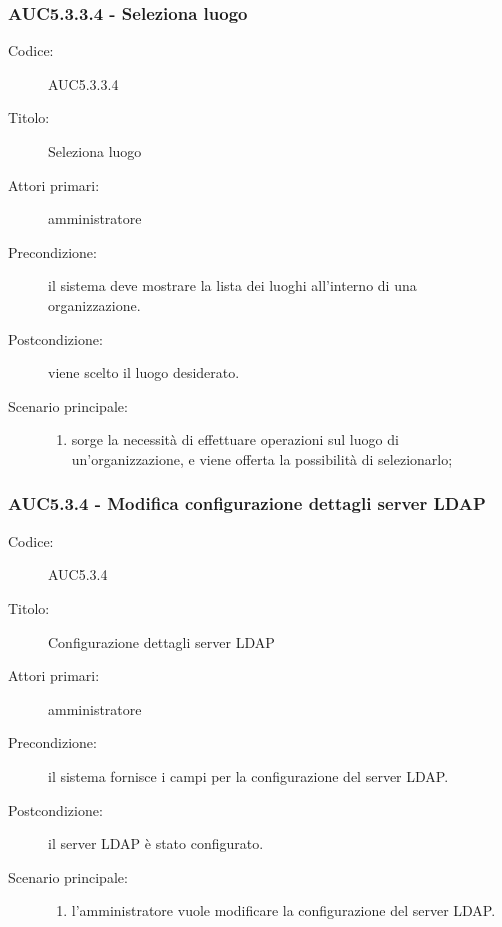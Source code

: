\documentclass[../analisi-dei-requisiti.tex]{subfiles}
\begin{document}
\subsubsection{AUC5.3.3.4 - Seleziona luogo}%
\label{subsub:AUC5.3.3.4}
\begin{description}
  \item[Codice:] AUC5.3.3.4
  \item[Titolo:] Seleziona luogo
  \item[Attori primari:] amministratore
  \item[Precondizione:] il sistema deve mostrare la lista dei luoghi all'interno di una organizzazione.
  \item[Postcondizione:] viene scelto il luogo desiderato.
  \item[Scenario principale:]
  \begin{enumerate}
    \item sorge la necessità di effettuare operazioni sul luogo di un'organizzazione, e viene offerta la possibilità di selezionarlo;
  \end{enumerate}
\end{description}

\subsubsection{AUC5.3.4 - Modifica configurazione dettagli server LDAP}%
  \label{subsub:AUC5.3.4}
  \begin{description}
    \item[Codice:] AUC5.3.4
    \item[Titolo:] Configurazione dettagli server LDAP
    \item[Attori primari:] amministratore
    \item[Precondizione:] il sistema fornisce i campi per la configurazione del server LDAP.
    \item[Postcondizione:] il server LDAP è stato configurato.
    \item[Scenario principale:]
    \begin{enumerate}
      \item l'amministratore vuole modificare la configurazione del server LDAP.
    \end{enumerate}
  \end{description}
\end{document}

